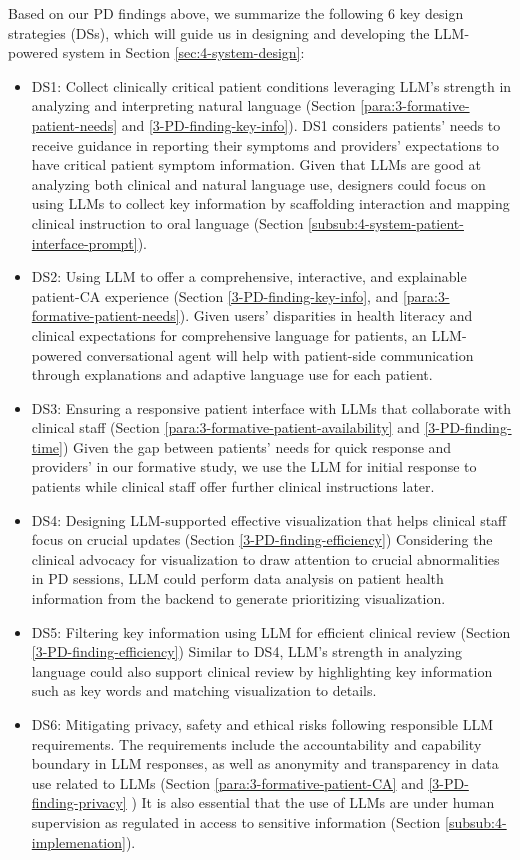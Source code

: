 Based on our PD findings above, we summarize the following 6 key design strategies (DSs), which will guide us in designing and developing the LLM-powered system in Section \ref{sec:4-system-design}:
\begin{itemize}
    \item DS1: Collect clinically critical patient conditions leveraging LLM's strength in analyzing and interpreting natural language (Section \ref{para:3-formative-patient-needs} and \ref{3-PD-finding-key-info}). DS1 considers patients' needs to receive guidance in reporting their symptoms and providers' expectations to have critical patient symptom information. Given that LLMs are good at analyzing both clinical and natural language use, designers could focus on using LLMs to collect key information by scaffolding interaction and mapping clinical instruction to oral language (Section \ref{subsub:4-system-patient-interface-prompt}).
    \item DS2: Using LLM to offer a comprehensive, interactive, and explainable patient-CA experience (Section \ref{3-PD-finding-key-info}, and \ref{para:3-formative-patient-needs}). Given users' disparities in health literacy and clinical expectations for comprehensive language for patients, an LLM-powered conversational agent will help with patient-side communication through explanations and adaptive language use for each patient.
    \item DS3: Ensuring a responsive patient interface with LLMs that collaborate with clinical staff (Section \ref{para:3-formative-patient-availability} and \ref{3-PD-finding-time}) Given the gap between patients' needs for quick response and providers' in our formative study, we use the LLM for initial response to patients while clinical staff offer further clinical instructions later.
    \item DS4: Designing LLM-supported effective visualization that helps clinical staff focus on crucial updates (Section \ref{3-PD-finding-efficiency}) Considering the clinical advocacy for visualization to draw attention to crucial abnormalities in PD sessions, LLM could perform data analysis on patient health information from the backend to generate prioritizing visualization.
    \item DS5: Filtering key information using LLM for efficient clinical review (Section \ref{3-PD-finding-efficiency}) Similar to DS4, LLM's strength in analyzing language could also support clinical review by highlighting key information such as key words and matching visualization to details.
    \item DS6: Mitigating privacy, safety and ethical risks following responsible LLM requirements. The requirements include the accountability and capability boundary in LLM responses, as well as anonymity and transparency in data use related to LLMs (Section \ref{para:3-formative-patient-CA} and \ref{3-PD-finding-privacy} ) It is also essential that the use of LLMs are under human supervision as regulated in access to sensitive information (Section \ref{subsub:4-implemenation}).
\end{itemize}


